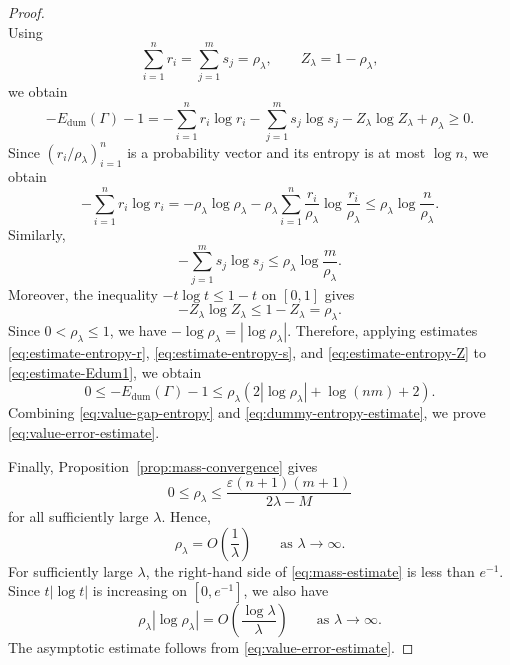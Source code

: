 \documentclass[10pt,a4paper]{amsart}
\newcommand{\eps}{\varepsilon}
\begin{document}
\begin{proof}
\begin{equation}
\end{equation}
Using
\begin{equation*}
  \sum_{i=1}^{n}r_i=\sum_{j=1}^{m}s_j=\rho_{\lambda},\qquad Z_{\lambda}=1-\rho_{\lambda},
\end{equation*}
we obtain
\begin{equation}\label{eq:estimate-Edum1}
  -E_{\mathrm{dum}}(\Gamma)-1 = -\sum_{i = 1}^{n}r_i\log r_i - \sum_{j = 1}^{m}s_j\log s_j - Z_{\lambda}\log Z_{\lambda} + \rho_{\lambda} \geq 0.
\end{equation}
Since $(r_i/\rho_{\lambda})_{i=1}^{n}$ is a probability vector and its entropy is at most $\log n$, we obtain 
\begin{equation}\label{eq:estimate-entropy-r}
  -\sum_{i = 1}^{n}r_i\log r_i = -\rho_{\lambda}\log\rho_{\lambda} - \rho_{\lambda}\sum_{i = 1}^{n}\frac{r_i}{\rho_{\lambda}}\log\frac{r_i}{\rho_{\lambda}} \leq \rho_{\lambda}\log\frac{n}{\rho_{\lambda}}.
\end{equation}
Similarly,
\begin{equation}\label{eq:estimate-entropy-s}
  -\sum_{j = 1}^{m}s_j\log s_j \leq \rho_{\lambda}\log\frac{m}{\rho_{\lambda}}.
\end{equation}
Moreover, the inequality $-t\log t\leq1-t$ on $[0,1]$ gives
\begin{equation}\label{eq:estimate-entropy-Z}
  -Z_{\lambda}\log Z_{\lambda}\leq1-Z_{\lambda}=\rho_{\lambda}.
\end{equation}
Since $0<\rho_{\lambda}\leq1$, we have $-\log\rho_{\lambda}=|\log\rho_{\lambda}|$. Therefore, applying estimates \eqref{eq:estimate-entropy-r}, \eqref{eq:estimate-entropy-s}, and \eqref{eq:estimate-entropy-Z} to \eqref{eq:estimate-Edum1}, we obtain 
\begin{equation}\label{eq:dummy-entropy-estimate}
  0 \leq -E_{\mathrm{dum}}(\Gamma)-1 \leq \rho_{\lambda}\left(2|\log\rho_{\lambda}| + \log(nm) + 2\right).
\end{equation}
Combining \eqref{eq:value-gap-entropy} and \eqref{eq:dummy-entropy-estimate}, we prove \eqref{eq:value-error-estimate}.

Finally, Proposition~\ref{prop:mass-convergence} gives
\begin{equation}\label{eq:mass-estimate}
  0\leq\rho_{\lambda}\leq\frac{\eps(n+1)(m+1)}{2\lambda-M}
\end{equation}
for all sufficiently large $\lambda$. Hence,
\begin{equation*}
  \rho_{\lambda}=O\left(\frac{1}{\lambda}\right) \qquad\text{as }\lambda\to\infty.
\end{equation*}
For sufficiently large $\lambda$, the right-hand side of \eqref{eq:mass-estimate} is less than $e^{-1}$. Since $t|\log t|$ is increasing on $[0,e^{-1}]$, we also have
\begin{equation*}
  \rho_{\lambda}|\log\rho_{\lambda}|=O\left(\frac{\log\lambda}{\lambda}\right) \qquad\text{as }\lambda\to\infty.
\end{equation*}
The asymptotic estimate follows from \eqref{eq:value-error-estimate}.
\end{proof}
\end{document}
